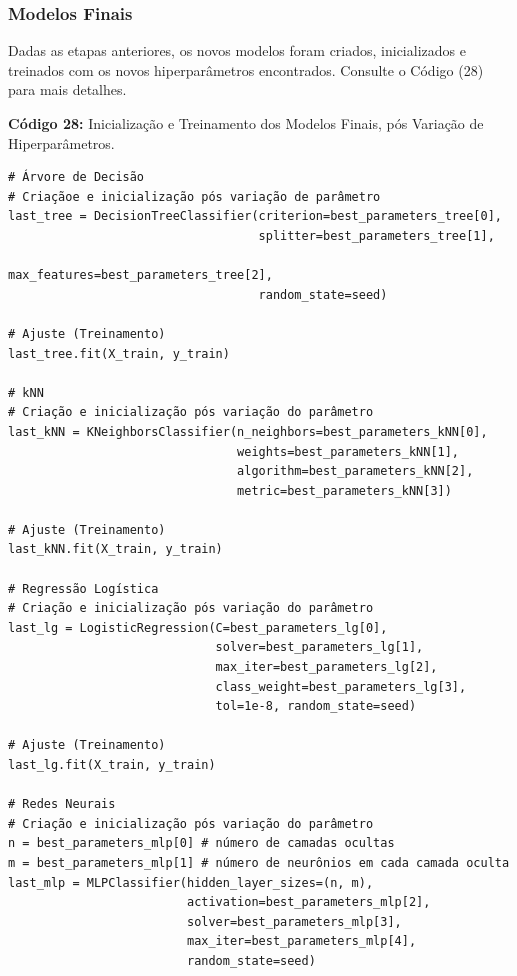 \documentclass[a4paper,12pt]{article} %
\begin{document}
\subsubsection{Modelos Finais}
Dadas as etapas anteriores, os novos modelos foram criados, inicializados e treinados com os novos hiperparâmetros encontrados. Consulte o Código (28) para mais detalhes.

\begin{center}
\textbf{Código 28:} Inicialização e Treinamento dos Modelos Finais, pós Variação de Hiperparâmetros.
\begin{verbatim}
# Árvore de Decisão
# Criaçãoe e inicialização pós variação de parâmetro
last_tree = DecisionTreeClassifier(criterion=best_parameters_tree[0],
                                   splitter=best_parameters_tree[1],
                                   max_features=best_parameters_tree[2],
                                   random_state=seed)

# Ajuste (Treinamento)
last_tree.fit(X_train, y_train)

# kNN
# Criação e inicialização pós variação do parâmetro
last_kNN = KNeighborsClassifier(n_neighbors=best_parameters_kNN[0],
                                weights=best_parameters_kNN[1],
                                algorithm=best_parameters_kNN[2],
                                metric=best_parameters_kNN[3])

# Ajuste (Treinamento)
last_kNN.fit(X_train, y_train)

# Regressão Logística
# Criação e inicialização pós variação do parâmetro
last_lg = LogisticRegression(C=best_parameters_lg[0],
                             solver=best_parameters_lg[1],
                             max_iter=best_parameters_lg[2],
                             class_weight=best_parameters_lg[3],
                             tol=1e-8, random_state=seed)

# Ajuste (Treinamento)
last_lg.fit(X_train, y_train)

# Redes Neurais
# Criação e inicialização pós variação do parâmetro
n = best_parameters_mlp[0] # número de camadas ocultas
m = best_parameters_mlp[1] # número de neurônios em cada camada oculta
last_mlp = MLPClassifier(hidden_layer_sizes=(n, m),
                         activation=best_parameters_mlp[2],
                         solver=best_parameters_mlp[3],
                         max_iter=best_parameters_mlp[4],
                         random_state=seed)


\end{verbatim}
\end{center}
\end{document}
